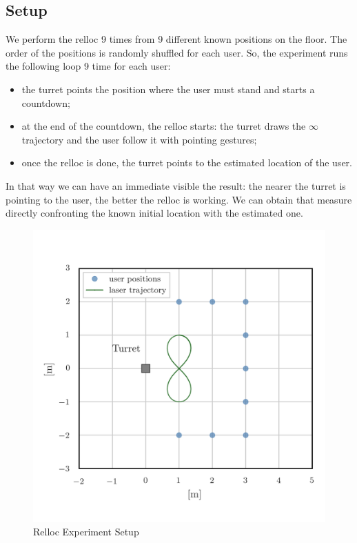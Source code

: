 \subsection{Setup}
We perform the \ac{relloc} 9 times from 9 different known positions on the floor. The order of the positions is randomly shuffled for each user. So, the experiment runs the following loop 9 time for each user:
\begin{itemize}
    \item the turret points the position where the user must stand and starts a countdown;
    \item at the end of the countdown, the \ac{relloc} starts: the turret draws the $\infty$ trajectory and the user follow it with pointing gestures;
    \item once the \ac{relloc} is done, the turret points to the estimated location of the user.
\end{itemize}
In that way we can have an immediate visible the result: the nearer the turret is pointing to the user, the better the \ac{relloc} is working. We can obtain that measure directly confronting the known initial location with the estimated one.
\begin{figure}
	\centering
	\includegraphics[width=\textwidth]{img/rellocExpSetup.png}%
	\caption{Relloc Experiment Setup}
	\label{fig:rellocExpSetup}
\end{figure}

